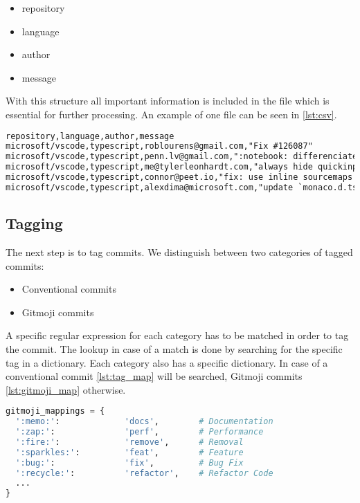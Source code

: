 \begin{itemize}
  \item repository
  \item language
  \item author
  \item message
\end{itemize}

With this structure all important information is included in the file which is
essential for further processing. An example of one file can be seen in
\autoref{lst:csv}.

\begin{lstlisting}[language=xml, label={lst:csv}, caption={Excerpt of \textit{typescript.csv} with commits from the repository \textit{microsoft/vscode}}]
repository,language,author,message
microsoft/vscode,typescript,roblourens@gmail.com,"Fix #126087"
microsoft/vscode,typescript,penn.lv@gmail.com,":notebook: differenciate editor focus and list view focus"
microsoft/vscode,typescript,me@tylerleonhardt.com,"always hide quickinput on iPad when focus is lost fixes #125284"
microsoft/vscode,typescript,connor@peet.io,"fix: use inline sourcemaps in watch task"
microsoft/vscode,typescript,alexdima@microsoft.com,"update `monaco.d.ts`"
\end{lstlisting}

\subsection{Tagging}

The next step is to tag commits. We distinguish between two categories of tagged
commits:

\begin{itemize}
  \item Conventional commits
  \item Gitmoji commits
\end{itemize}

A specific regular expression for each category has to be matched in order to
tag the commit. The lookup in case of a match is done by searching for the
specific tag in a dictionary. Each category also has a specific dictionary. In
case of a conventional commit \autoref{lst:tag_map} will be searched,
Gitmoji commits \autoref{lst:gitmoji_map} otherwise.

\begin{lstlisting}[language=python, label={lst:gitmoji_map}, caption={Dictionary for Gitmoji mappings}]
gitmoji_mappings = {
  ':memo:':             'docs',        # Documentation
  ':zap:':              'perf',        # Performance
  ':fire:':             'remove',      # Removal
  ':sparkles:':         'feat',        # Feature
  ':bug:':              'fix',         # Bug Fix
  ':recycle:':          'refactor',    # Refactor Code
  ...
}
\end{lstlisting}

